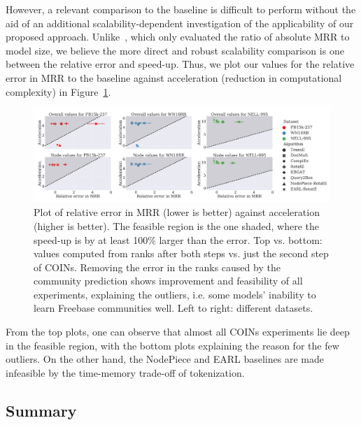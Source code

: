 However, a relevant comparison to the baseline is difficult to perform without the aid of an additional scalability-dependent investigation of the applicability of our proposed approach. Unlike~\cite{chen_entity-agnostic_2023}, which only evaluated the ratio of absolute MRR to model size, we believe the more direct and robust scalability comparison is one between the relative error and speed-up. Thus, we plot our values for the relative error in MRR to the baseline against acceleration (reduction in computational complexity) in Figure~\ref{fig:feasibility}. 

\begin{figure}[H]
\begin{center}
\includegraphics[width=\textwidth]{figures/coins/feasibility_2.pdf}
\end{center}
\caption[Plot of relative error in MRR against acceleration.]{Plot of relative error in MRR (lower is better) against acceleration (higher is better). The feasible region is the one shaded, where the speed-up is by at least 100\% larger than the error. Top vs. bottom: values computed from ranks after both steps vs. just the second step of COINs. Removing the error in the ranks caused by the community prediction shows improvement and feasibility of all experiments, explaining the outliers, i.e. some models' inability to learn Freebase communities well. Left to right: different datasets.}
\label{fig:feasibility}
\end{figure}

From the top plots, one can observe that almost all COINs experiments lie deep in the feasible region, with the bottom plots explaining the reason for the few outliers. On the other hand, the NodePiece and EARL baselines are made infeasible by the time-memory trade-off of tokenization.

\subsection{Summary}

